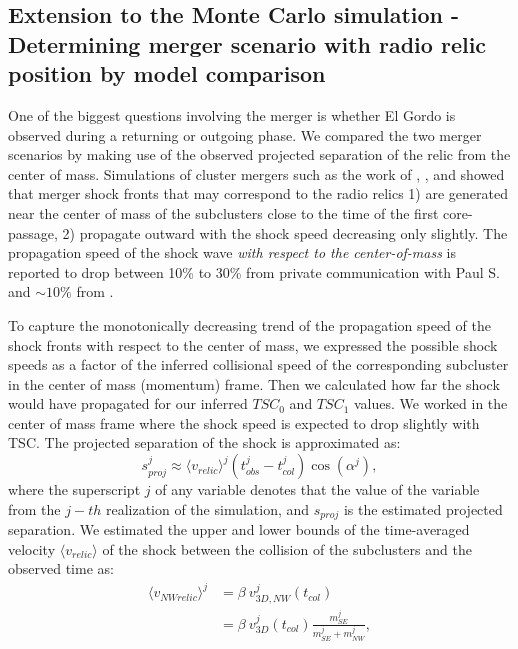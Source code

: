 
\subsection{Extension to the Monte Carlo simulation - Determining merger
scenario with radio relic position by model comparison}

One of the biggest questions involving the merger is whether El Gordo is
observed during a returning or outgoing phase. We compared the two merger
scenarios by making use of the observed projected separation of the relic from the
center of mass.
Simulations of cluster mergers such as the work of \citet{Paul2011b},
\citet{VanWeerenRJ2011}, and \citet{Springel2007} showed that merger shock
fronts that may correspond to the radio relics 1) are generated near the
center of mass of the subclusters close to the time of the first
core-passage, 2) propagate outward with the shock speed decreasing only slightly.
The propagation speed of the shock wave {\it with respect to the
center-of-mass} is reported to drop between 10\% to
30\% from private communication with Paul S. and $\sim 10\%$ from
\citet{Springel2007}. \par 
To capture the monotonically decreasing trend of the
propagation speed of the shock fronts with respect to the center of
mass, we expressed the possible shock speeds as a factor of the inferred
collisional speed of the corresponding subcluster in the center of mass
(momentum) frame. 
Then we calculated how far the shock would have propagated for our inferred
$TSC_0$ and $TSC_1$ values. We worked in the center of mass frame where the
shock speed is expected to drop slightly with TSC. 
The projected separation of the shock is approximated as:
\begin{equation}
	s^j_{proj} \approx \langle v_{relic} \rangle^j (t^j_{obs} - t^j_{col})
	\cos(\alpha^j),
	\label{eq:proj_s_model}
\end{equation}
where the superscript $j$ of any variable denotes that the value of the
variable from the $j-th$ realization of the simulation, and $s_{proj}$ is the estimated projected
separation. We estimated the upper and lower bounds of the time-averaged velocity
$\langle v_{relic} \rangle$ of the shock between
the collision of the subclusters and the observed time as:  
\begin{align}
	\label{eqn:NW_speed}
	\langle v_{NW relic} \rangle^j &= \beta~v^j_{3D, NW}(t_{col}) \\
	&= \beta~v^j_{3D}(t_{col}) \frac{m^j_{SE}}{m^j_{SE} + m^j_{NW}}, 
\end{align}
